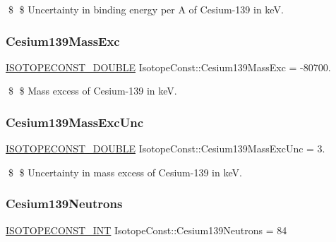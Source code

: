 \$ \$ Uncertainty in binding energy per A of Cesium-\/139 in keV. \mbox{\label{group___isotope_const-_cesium-_cs139_ga4c064a590d03f131587cf2cbe44b0200}} 
\subsubsection{\texorpdfstring{Cesium139\+Mass\+Exc}{Cesium139MassExc}}
{\footnotesize\ttfamily \mbox{\hyperlink{group___isotope_const-_macros_ga8f45a7272ce02c0b4c65c44636ed719a}{I\+S\+O\+T\+O\+P\+E\+C\+O\+N\+S\+T\+\_\+\+D\+O\+U\+B\+LE}} Isotope\+Const\+::\+Cesium139\+Mass\+Exc = -\/80700.}

\$ \$ Mass excess of Cesium-\/139 in keV. \mbox{\label{group___isotope_const-_cesium-_cs139_ga7a3f7eb274db0e6a4e3049bac77ff7a8}} 
\subsubsection{\texorpdfstring{Cesium139\+Mass\+Exc\+Unc}{Cesium139MassExcUnc}}
{\footnotesize\ttfamily \mbox{\hyperlink{group___isotope_const-_macros_ga8f45a7272ce02c0b4c65c44636ed719a}{I\+S\+O\+T\+O\+P\+E\+C\+O\+N\+S\+T\+\_\+\+D\+O\+U\+B\+LE}} Isotope\+Const\+::\+Cesium139\+Mass\+Exc\+Unc = 3.}

\$ \$ Uncertainty in mass excess of Cesium-\/139 in keV. \mbox{\label{group___isotope_const-_cesium-_cs139_ga3feb2b03785475992c86572558f0fe1b}} 
\subsubsection{\texorpdfstring{Cesium139\+Neutrons}{Cesium139Neutrons}}
{\footnotesize\ttfamily \mbox{\hyperlink{group___isotope_const-_macros_ga5f18360b3e99483a35c32d789e62621c}{I\+S\+O\+T\+O\+P\+E\+C\+O\+N\+S\+T\+\_\+\+I\+NT}} Isotope\+Const\+::\+Cesium139\+Neutrons = 84}

